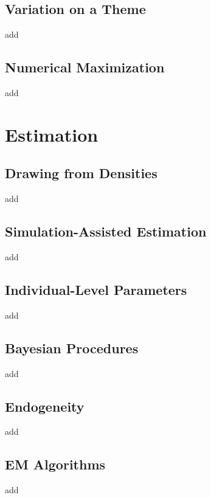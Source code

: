 \documentclass[
  letterpaper,
  DIV=11,
  numbers=noendperiod]{scrreprt}
\begin{document}
\chapter{Variation on a Theme}\label{sec-variations}

add

\chapter{Numerical Maximization}\label{sec-mazimization}

add

\part{Estimation}

\chapter{Drawing from Densities}\label{sec-densities}

add

\chapter{Simulation-Assisted Estimation}\label{sec-sim_estimation}

add

\chapter{Individual-Level Parameters}\label{sec-indiv_parameters}

add

\chapter{Bayesian Procedures}\label{sec-bayesian}

add

\chapter{Endogeneity}\label{sec-endogeneity}

add

\chapter{EM Algorithms}\label{sec-em_algo}

add
\end{document}
